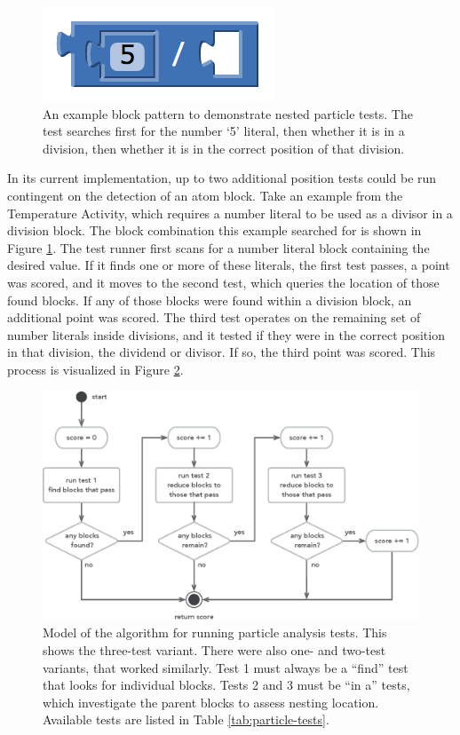\begin{figure}
  \centering
      \includegraphics{images/ch4-particle-example-5div}
  \caption[Example blocks to demonstrate nested particle tests]{An example block pattern to demonstrate nested particle tests. The test searches first for the number `5' literal, then whether it is in a division, then whether it is in the correct position of that division.}
  \label{fig:particle-example-5div}
\end{figure}
In its current implementation, up to two additional position tests could be run contingent on the detection of an atom block. Take an example from the Temperature Activity, which requires a number literal to be used as a divisor in a division block. The block combination this example searched for is shown in Figure \ref{fig:particle-example-5div}. The test runner first scans for a number literal block containing the desired value. If it finds one or more of these literals, the first test passes, a point was scored, and it moves to the second test, which queries the location of those found blocks. If any of those blocks were found within a division block, an additional point was scored. The third test operates on the remaining set of number literals inside divisions, and it tested if they were in the correct position in that division, the dividend or divisor. If so, the third point was scored. This process is visualized in Figure \ref{fig:particle-run3}.

\begin{figure}
  \centering
      \includegraphics[width=\textwidth]{diagrams/particle-run3}
  \caption[Particle analysis test running algorithm]{Model of the algorithm for running particle analysis tests. This shows the three-test variant. There were also one- and two-test variants, that worked similarly. Test 1 must always be a ``find'' test that looks for individual blocks. Tests 2 and 3 must be ``in a'' tests, which investigate the parent blocks to assess nesting location. Available tests are listed in Table \ref{tab:particle-tests}.}
  \label{fig:particle-run3}
\end{figure}

